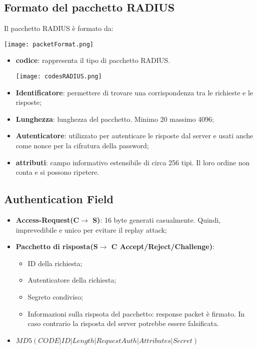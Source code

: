 \documentclass{article}
\theoremstyle{remark}
\begin{document}
\subsection{Formato del pacchetto RADIUS}
Il pacchetto RADIUS è formato da:\begin{center}
	\texttt{[image: packetFormat.png]}
\end{center}\begin{itemize}
	\item \textbf{codice}: rappresenta il tipo di pacchetto RADIUS.\begin{center}
		      \texttt{[image: codesRADIUS.png]}
	      \end{center}
	\item \textbf{Identificatore}: permettere di trovare una corrispondenza tra le richieste e le risposte;
	\item \textbf{Lunghezza}: lunghezza del pacchetto. Minimo 20 massimo 4096;
	\item \textbf{Autenticatore}: utilizzato per autenticare le risposte dal server e usati anche come nonce per la cifratura della password;
	\item \textbf{attributi}: campo informativo estensibile di circa 256 tipi. Il loro ordine non conta e si possono ripetere.
\end{itemize}
\subsection{Authentication Field}
\begin{itemize}
	\item \textbf{Access-Request(C$\rightarrow$ S)}: 16 byte generati casualmente. Quindi, imprevedibile e unico per evitare il replay attack;
	\item \textbf{Pacchetto di risposta(S$\rightarrow$ C Accept/Reject/Challenge)}:\begin{itemize}
		      \item ID della richiesta;
		      \item Autenticatore della richiesta;
		      \item Segreto condiviso;
		      \item Informazioni sulla rispsota del pacchetto: response packet è firmato. In caso contrario la risposta del server potrebbe essere falsificata.
	      \end{itemize}
	\item $MD5(CODE|ID|Length|RequestAuth|Attributes|Secret)$
\end{itemize}
\end{document}
